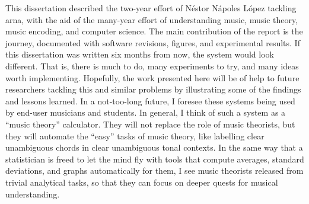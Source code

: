 
This dissertation described the two-year effort of N\'estor
N\'apoles L\'opez tackling \gls{arna}, with the aid of the
many-year effort of understanding music, music theory, music
encoding, and computer science. The main contribution of the
report is the journey, documented with software revisions,
figures, and experimental results. If this dissertation was
written six months from now, the system would look
different. That is, there is much to do, many experiments to
try, and many ideas worth implementing. Hopefully, the work
presented here will be of help to future researchers
tackling this and similar problems by illustrating some of
the findings and lessons learned. In a not-too-long future,
I foresee these systems being used by end-user musicians and
students. In general, I think of such a system as a ``music
theory'' calculator. They will not replace the role of music
theorists, but they will automate the ``easy'' tasks of
music theory, like labelling clear unambiguous chords in
clear unambiguous tonal contexts. In the same way that a
statistician is freed to let the mind fly with tools that
compute averages, standard deviations, and graphs
automatically for them, I see music theorists released from
trivial analytical tasks, so that they can focus on deeper
quests for musical understanding.
